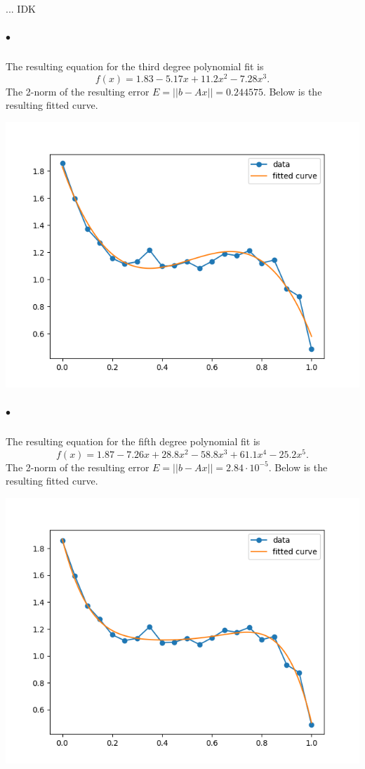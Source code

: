 \documentclass[12pt]{article}
\begin{document}
		... IDK
		
	\subparagraph{$\bullet$}
		The resulting equation for the third degree polynomial fit is 
		\[
		f(x) = 1.83 - 5.17x + 11.2x^2 - 7.28x^3.
		\]
		The 2-norm of the resulting error $E = ||b - Ax|| = 0.244575$. Below is the resulting fitted curve.
		
		\includegraphics[scale=0.7]{Figure_3}
		
	\subparagraph{$\bullet$}
		The resulting equation for the fifth degree polynomial fit is 
		\[
		f(x) = 1.87 - 7.26x + 28.8x^2 - 58.8x^3 + 61.1x^4 - 25.2x^5.
		\]
		The 2-norm of the resulting error $E = ||b - Ax|| = 2.84\cdot10^{-5}$. Below is the resulting fitted curve.
		
		\includegraphics[scale=0.7]{Figure_4}
		
\end{document}
